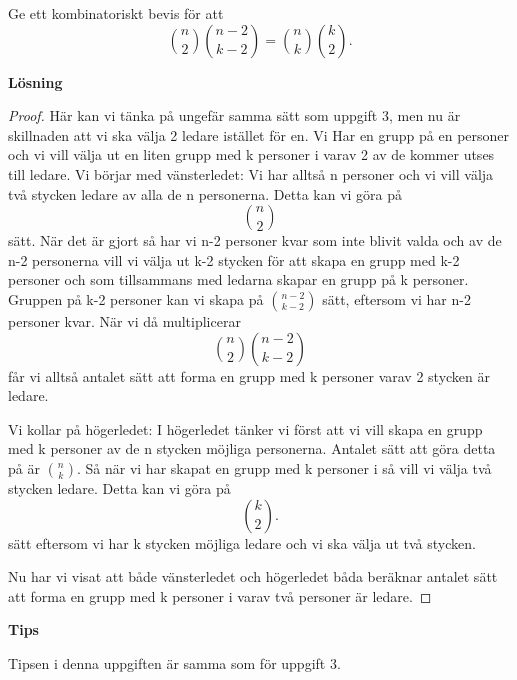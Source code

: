 \documentclass{tufte-handout}
\begin{document}
\begin{xca}
	Ge ett kombinatoriskt bevis för att
	$$\binom{n}{2}\binom{n-2}{k-2} = \binom{n}{k}\binom{k}{2}.$$
	
\noindent\textbf{Lösning}
\begin{proof}
Här kan vi tänka på ungefär samma sätt som uppgift 3, men nu är skillnaden att vi ska välja 2 ledare istället för en. 
Vi Har en grupp på en personer och vi vill välja ut en liten grupp med k personer i varav 2 av de kommer utses till ledare. 
Vi börjar med vänsterledet: Vi har alltså n personer och vi vill välja två stycken ledare av alla de n personerna. Detta kan vi göra på $$\binom{n}{2}$$ sätt. När det är gjort så har vi n-2 personer kvar som inte blivit valda och av de n-2 personerna vill vi välja ut k-2 stycken för att skapa en grupp med k-2 personer och som tillsammans med ledarna skapar en grupp på k personer. Gruppen på k-2 personer kan vi skapa på $\binom{n-2}{k-2}$ sätt, eftersom vi har n-2 personer kvar. När vi då multiplicerar $$\binom{n}{2}\binom{n-2}{k-2}$$ får vi alltså antalet sätt att forma en grupp med k personer varav 2 stycken är ledare. 

Vi kollar på högerledet: I högerledet tänker vi först att vi vill skapa en grupp med k personer av de n stycken möjliga personerna. Antalet sätt att göra detta på är $\binom{n}{k}$. Så när vi har skapat en grupp med k personer i så vill vi välja två stycken ledare. Detta kan vi göra på $$\binom{k}{2}.$$ sätt eftersom vi har k stycken möjliga ledare och vi ska välja ut två stycken. 

Nu har vi visat att både vänsterledet och högerledet båda beräknar antalet sätt att forma en grupp med k personer i varav två personer är ledare. 
\end{proof}
\noindent\textbf{Tips}

Tipsen i denna uppgiften är samma som för uppgift 3. 

\end{xca}
\end{document}

